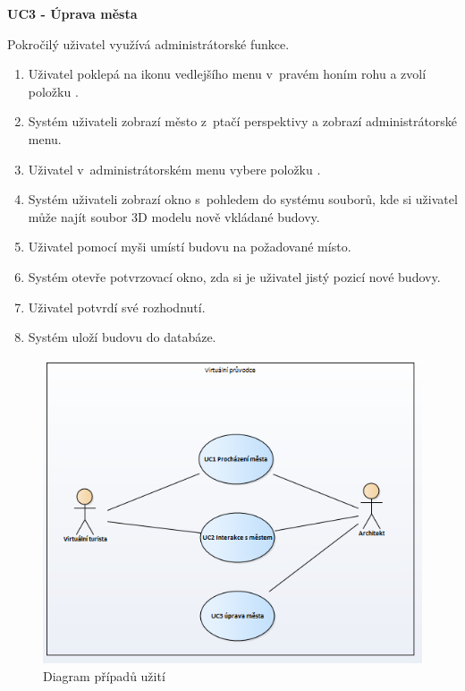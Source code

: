 \documentclass[thesis=B,czech]{FITthesis}[2012/06/26]
\begin{document}
\begin{description}
 		\item \textbf{UC3 - Úprava města}
 		
 		Pokročilý uživatel využívá administrátorské funkce.
 		\begin{enumerate}
    		\item Uživatel poklepá na ikonu vedlejšího menu v~pravém honím rohu a zvolí položku .
    		\item Systém uživateli zobrazí město z~ptačí perspektivy a zobrazí administrátorské menu.
    		\item Uživatel v~administrátorském menu vybere položku .
    		\item Systém uživateli zobrazí okno s~pohledem do systému souborů, kde si uživatel může najít soubor 3D modelu nově vkládané budovy.
    		\item Uživatel pomocí myši umístí budovu na požadované místo.
    		\item Systém otevře potvrzovací okno, zda si je uživatel jistý pozicí nové budovy.
    		\item Uživatel potvrdí své rozhodnutí.
    		\item Systém uloží budovu do databáze.
 		\end{enumerate}
		
 		
 	\end{description}	
 	
 	\begin{figure}
  		\includegraphics{UCdiagram.png}
  		\caption{Diagram případů užití}
  		\label{fig:UCdiagram}
	\end{figure}
	
\end{document}
